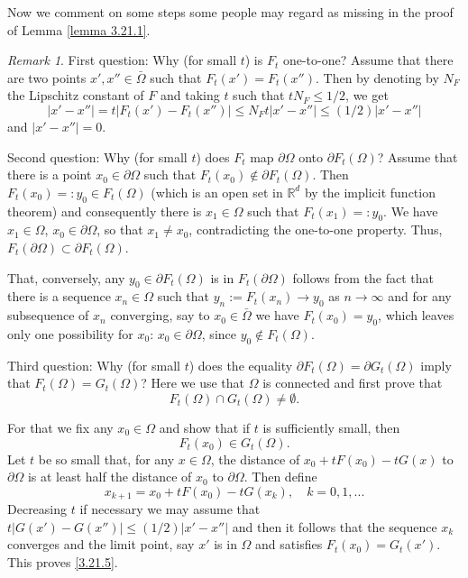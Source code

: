 \documentclass[11pt, reqno]{amsart}
\theoremstyle{remark}
\newtheorem{remark}[theorem]{Remark}
\theoremstyle{definition}
\newcommand\bR{\mathbb{R}}
\begin{document}
Now we   comment on some steps some people
may regard as missing in the proof
of Lemma \ref{lemma 3.21.1}.
\begin{remark}
                            \label{remark 3.21.2}
First question: Why (for small $t$) is $F_{t}$
one-to-one? Assume that there are two
points $x',x''\in\bar\Omega$ such that
$F_{t}(x')=F_{t}(x'')$. Then
by denoting by $N_{F}$ the Lipschitz constant of $F$
and taking $t$ such that $tN_{F}\leq 1/2$, we get
$$
|x'-x''|=t|F_{t}(x')-F_{t}(x'')|\leq N_{F}t|x'-x''|
\leq(1/2)|x'-x''|
$$
and $|x'-x''|=0$.

Second question: Why (for small $t$) does $F_{t}$
map  $\partial\Omega$ onto $\partial F_{t}(\Omega)$?
Assume that there is a point $x_{0}\in\partial\Omega$
such that $F_{t}(x_{0})\not\in\partial F_{t}(\Omega)$.
Then $F_{t}(x_{0})=:y_{0}\in F_{t}(\Omega)$
(which is an open set in $\bR^{d}$
by the implicit function theorem)
and consequently there is $x_{1}\in\Omega$
such that $F_{t}(x_{1})=:y_{0}$. We have 
$x_{1}\in\Omega$, $x_{0}\in\partial\Omega$,
so that $x_{1}\ne x_{0}$, contradicting the one-to-one
property. Thus, $F_{t}(\partial\Omega)\subset
\partial F_{t}(\Omega)$.

That, conversely, any $y_{0}\in \partial F_{t}(\Omega)$ is in 
$F_{t}(\partial\Omega)$ follows from the fact that
there is a sequence $x_{n}\in\Omega$ such that
$y_{n}:=F_{t}(x_{n})\to y_{0}$ as $n\to\infty$
and for any subsequence of $x_{n}$
converging, say to $x_{0}\in\bar\Omega$ we have $F_{t}(x_{0})
=y_{0}$, which leaves only one possibility for $x_{0}$:
$x_{0}\in \partial \Omega$, since $y_{0}\not
\in F_{t}(\Omega)$.


Third question: Why (for small $t$)
does the equality $\partial F_{t}(\Omega)=
\partial G_{t}(\Omega)$ imply that 
$  F_{t}(\Omega)=
 G_{t}(\Omega)$? Here we use that $\Omega$
is connected and first prove that
$$ 
F_{t}(\Omega)\cap
 G_{t}(\Omega)\ne\emptyset.
$$
  
For that we fix any $x_{0}\in\Omega$ and show that
if $t$ is sufficiently small, then 
\begin{equation}
                                        \label{3.21.5}
F_{t}(x_{0})
\in G_{t}(\Omega).
\end{equation}
Let $t$ be so small that, for any $x\in\Omega$,
 the distance
of $x_{0}+tF(x_{0})-tG(x)$ to $\partial\Omega$
is at least half the distance of $x_{0}$ to
$\partial\Omega$. Then define  
$$
x_{k+1}=x_{0}+tF(x_{0})-tG(x_{k}),\quad k=0, 1,...
$$
Decreasing $t$ if necessary we may assume that
$t|G(x')-G(x'')|\leq(1/2)|x'-x''|$ and then it follows that
the sequence $x_{k}$ converges and the limit point,
say $x'$ is in $\Omega$ and satisfies 
$F_{t}(x_{0})=G_{t}(x')$. This proves \eqref{3.21.5}.



\end{remark}
\end{document}
